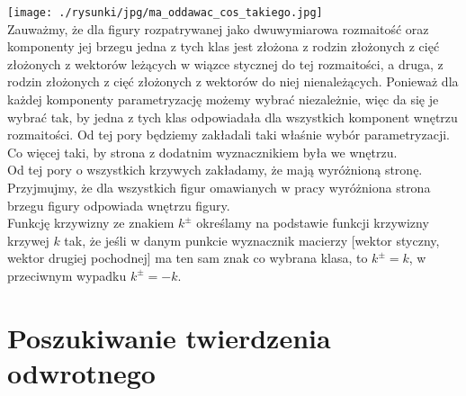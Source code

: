 \documentclass[a4paper, 12pt, twosided]{article}
\newcommand{\smalltodoII}[1]{\hfill \break \textbf{\ \textcolor{violet}{To do: #1}}\hfill \break}
\newcommand{\rysunek}[1]{\hfill \break\\[16pt] \Huge \textbf{\textcolor{violet}{Brakujący rysunek 
\normalsize
#1}} \hfill
\break \\[16pt] \normalsize}
\begin{document}
\texttt{[image: ./rysunki/jpg/ma\_oddawac\_cos\_takiego.jpg]} \\
Zauważmy, że dla figury rozpatrywanej jako dwuwymiarowa rozmaitość oraz komponenty jej brzegu jedna 
z tych
klas jest złożona z rodzin złożonych z cięć złożonych z wektorów leżących w wiązce stycznej do tej 
rozmaitości, a druga, z rodzin złożonych z cięć złożonych z wektorów do 
niej
nienależących. Ponieważ dla każdej komponenty parametryzację możemy wybrać niezależnie, więc da się 
je wybrać
tak, by jedna z tych klas odpowiadała dla wszystkich komponent wnętrzu rozmaitości. Od tej pory 
będziemy
zakładali taki właśnie wybór parametryzacji. Co więcej taki, by strona z 
dodatnim wyznacznikiem była 
we wnętrzu.
\\
Od tej pory o wszystkich krzywych zakładamy, że mają wyróżnioną stronę.
Przyjmujmy, że dla wszystkich figur omawianych w pracy wyróżniona strona brzegu figury odpowiada 
wnętrzu figury. \\
Funkcję krzywizny ze znakiem $k^\pm$ określamy na podstawie funkcji krzywizny krzywej $k$ tak, że 
jeśli w danym punkcie wyznacznik 
macierzy [wektor styczny, wektor 
drugiej pochodnej] 
ma ten
sam znak co wybrana klasa, to $k^\pm = k$, w przeciwnym wypadku $k^\pm = -k$.
\section{Poszukiwanie twierdzenia odwrotnego} 
\end{document}
